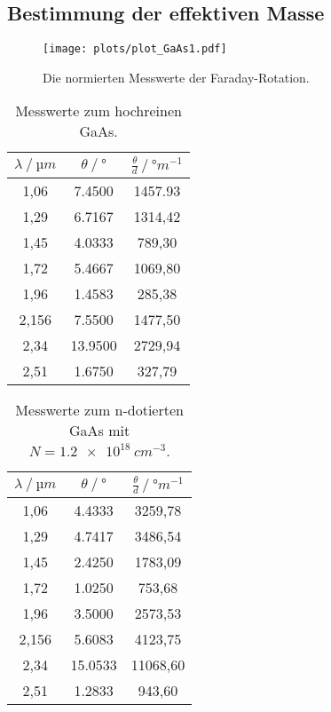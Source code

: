 \subsection{Bestimmung der effektiven Masse}

\begin{figure}
  \centering
  \texttt{[image: plots/plot\_GaAs1.pdf]}
  \caption{Die normierten Messwerte der Faraday-Rotation.}
  \label{fig:GaAs1}
\end{figure}

\begin{table}
  \centering
  \caption{Messwerte zum hochreinen GaAs.}
  \label{tab:rein}
  \begin{tabular}{S[table-format=1.3] S[table-format=2.4] S[table-format=4.2]}
    \toprule
    {$\lambda\:/\:\si{µm}$} & {$\theta\:/\:\si{\degree}$} & {$\frac{\theta}{d}\:/\:\si{\degree m^{-1}}$} \\
    ,06  & 7.4500  & 1457.93 \\
    1,29  & 6.7167  & 1314,42 \\
    1,45  & 4.0333  & 789,30 \\
    1,72  & 5.4667  & 1069,80 \\
    1,96  & 1.4583  & 285,38 \\
    2,156 & 7.5500  & 1477,50 \\
    2,34  & 13.9500 & 2729,94 \\
    2,51  & 1.6750  & 327,79 \\
    \bottomrule
  \end{tabular}
\end{table}

\begin{table}
  \centering
  \caption{Messwerte zum n-dotierten GaAs mit $N = \SI{1.2e18}{cm^{-3}}$.}
  \label{tab:rein}
  \begin{tabular}{S[table-format=1.3] S[table-format=2.4] S[table-format=5.2]}
    \toprule
    {$\lambda\:/\:\si{µm}$} & {$\theta\:/\:\si{\degree}$} & {$\frac{\theta}{d}\:/\:\si{\degree m^{-1}}$} \\
    ,06  & 4.4333  & 3259,78 \\
    1,29  & 4.7417  & 3486,54 \\
    1,45  & 2.4250  & 1783,09 \\
    1,72  & 1.0250  & 753,68 \\
    1,96  & 3.5000  & 2573,53 \\
    2,156 & 5.6083  & 4123,75 \\
    2,34  & 15.0533 & 11068,60 \\
    2,51  & 1.2833  & 943,60 \\
    \bottomrule
  \end{tabular}
\end{table}

